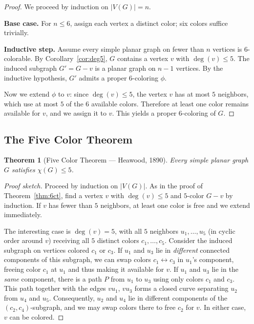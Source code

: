 \documentclass[12pt,a4paper]{article}
\theoremstyle{definition}
\theoremstyle{plain}
\newtheorem{theorem}{Theorem}[section]
\theoremstyle{remark}
\begin{document}
\begin{proof}
  We proceed by induction on $|V(G)| = n$.

  \medskip\noindent
  \textbf{Base case.}  For $n \leq 6$, assign each vertex a distinct color;
  six colors suffice trivially.

  \medskip\noindent
  \textbf{Inductive step.}  Assume every simple planar graph on fewer than $n$
  vertices is $6$-colorable.  By Corollary~\ref{cor:deg5}, $G$ contains a
  vertex $v$ with $\deg(v) \leq 5$.  The induced subgraph $G' = G - v$ is a
  planar graph on $n-1$ vertices.  By the inductive hypothesis, $G'$ admits a
  proper $6$-coloring $\phi$.

  Now we extend $\phi$ to $v$: since $\deg(v) \leq 5$, the vertex $v$ has at
  most $5$ neighbors, which use at most $5$ of the $6$ available colors.
  Therefore at least one color remains available for $v$, and we assign it to
  $v$.  This yields a proper $6$-coloring of $G$.
\end{proof}

\subsection{The Five Color Theorem}

\begin{theorem}[Five Color Theorem — Heawood, 1890]\label{thm:5ct}
  Every simple planar graph $G$ satisfies $\chi(G) \leq 5$.
\end{theorem}

\begin{proof}[Proof sketch]
  Proceed by induction on $|V(G)|$.  As in the proof of
  Theorem~\ref{thm:6ct}, find a vertex $v$ with $\deg(v) \leq 5$ and
  $5$-color $G - v$ by induction.  If $v$ has fewer than $5$ neighbors, at
  least one color is free and we extend immediately.

  The interesting case is $\deg(v) = 5$, with all $5$ neighbors $u_1,\ldots,u_5$
  (in cyclic order around $v$) receiving all $5$ distinct colors $c_1,\ldots,c_5$.
  Consider the induced subgraph on vertices colored $c_1$ or $c_3$.  If $u_1$
  and $u_3$ lie in \emph{different} connected components of this subgraph, we
  can swap colors $c_1 \leftrightarrow c_3$ in $u_1$'s component, freeing color
  $c_1$ at $u_1$ and thus making it available for $v$.  If $u_1$ and $u_3$ lie
  in the \emph{same} component, there is a path $P$ from $u_1$ to $u_3$ using
  only colors $c_1$ and $c_3$.  This path together with the edges $vu_1$,
  $vu_3$ forms a closed curve separating $u_2$ from $u_4$ and $u_5$.
  Consequently, $u_2$ and $u_4$ lie in different components of the
  $(c_2,c_4)$-subgraph, and we may swap colors there to free $c_2$ for $v$.
  In either case, $v$ can be colored.
\end{proof}
\end{document}
